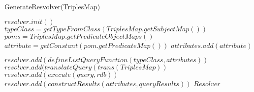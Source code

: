 \begin{algorithm}
\caption{GenerateResvolver(TriplesMap)}
\label{algGenerateQueryRootNaive}
\begin{algorithmic}[1]
\STATE $resolver.init()$
\STATE $typeClass = getTypeFromClass(TriplesMap.getSubjectMap())$
\STATE $poms = TriplesMap.getPredicateObjectMaps()$
  \STATE $attribute = getConstant(pom.getPredicateMap())$
  \STATE $attributes.add(attribute)$
\ENDFOR

\STATE $resolver.add(defineListQueryFunction(typeClass,attributes))$
\STATE $resolver.add(translateQuery(trans(TriplesMap))$
\STATE $resolver.add(execute(query,rdb))$
\STATE $resolver.add(constructResults(attributes,queryResults))$
\RETURN $Resolver$


\end{algorithmic}
\end{algorithm}